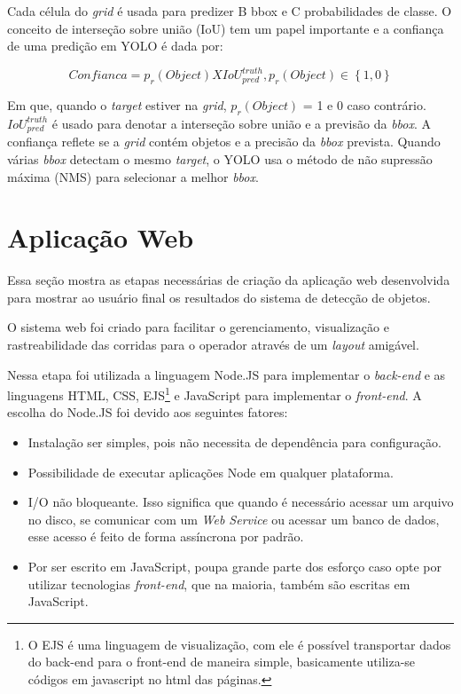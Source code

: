 Cada célula do  \textit{grid} é usada para predizer B bbox e C probabilidades de classe. O conceito de interseção sobre união (IoU) tem um papel importante e a confiança de uma predição em YOLO é dada por:

\begin{equation}
    Confianca = p_r(Object) X IoU_{pred}^{truth} , p_r(Object) \in \left \{ 1\right.,\left.0\right \}
\end{equation}

Em que, quando o \textit{target} estiver na \textit{grid}, \(p_r(Object)\) = 1 e 0 caso contrário. \(IoU_{pred}^{truth}\) é usado para denotar a interseção sobre união e a previsão da \textit{bbox}. A confiança reflete se a \textit{grid} contém objetos e a precisão da \textit{bbox} prevista. Quando várias \textit{bbox} detectam o mesmo \textit{target}, o YOLO usa o método de não supressão máxima (NMS) para selecionar a melhor \textit{bbox}.


\section{Aplicação Web} \label{sec:web}

Essa seção mostra as etapas necessárias de criação da aplicação web desenvolvida para mostrar ao usuário final os resultados do sistema de detecção de objetos.

O sistema web foi criado para facilitar o gerenciamento, visualização e rastreabilidade das corridas para o operador através de um \textit{layout} amigável.

Nessa etapa foi utilizada a linguagem Node.JS para implementar o \textit{back-end} e as linguagens HTML, CSS, EJS\footnote{O EJS é uma linguagem de visualização, com ele é possível transportar dados do back-end para o front-end de maneira simple, basicamente utiliza-se códigos em javascript no html das páginas.} e JavaScript para implementar o \textit{front-end}. A escolha do Node.JS foi devido aos seguintes fatores:

\begin{itemize}
    \item Instalação ser simples, pois não necessita de dependência para configuração.
    \item Possibilidade de executar aplicações Node em qualquer plataforma.
    \item I/O não bloqueante. Isso significa que quando é necessário acessar um arquivo no disco, se comunicar com um \textit{Web Service} ou acessar um banco de dados, esse acesso é feito de forma assíncrona por padrão.
    \item Por ser escrito em JavaScript, poupa grande parte dos esforço caso opte por utilizar tecnologias \textit{front-end}, que na maioria, também são escritas em JavaScript.
\end{itemize}
 
